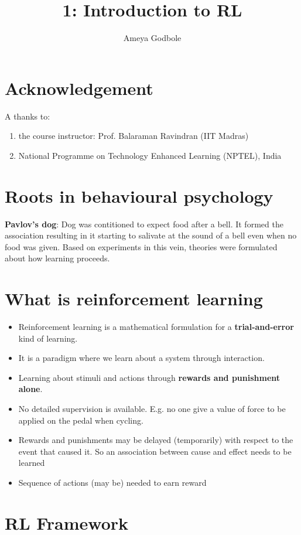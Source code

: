 \documentclass[a4paper]{article}
\title{1: Introduction to RL\vspace{-2ex}}
\author{Ameya Godbole}
\date{\vspace{-5ex}}
\begin{document}
\maketitle

\section{Acknowledgement}

A thanks to:
\begin{enumerate}
\item the course instructor: Prof. Balaraman Ravindran (IIT Madras)
\item National Programme on Technology Enhanced Learning (NPTEL), India
\end{enumerate}

\section{Roots in behavioural psychology}
\textbf{Pavlov's dog}: Dog was contitioned to expect food after a bell. It formed the association resulting in it starting to salivate at the sound of a bell even when no food was given. Based on experiments in this vein, theories were formulated about how learning proceeds.

\section{What is reinforcement learning}
\begin{itemize}
\item Reinforcement learning is a mathematical formulation for a \textbf{trial-and-error} kind of learning.
\item It is a paradigm where we learn about a system through interaction.
\item Learning about stimuli and actions through \textbf{rewards and punishment alone}.
\item No detailed supervision is available. E.g. no one give a value of force to be applied on the pedal when cycling.
\item Rewards and punishments may be delayed (temporarily) with respect to the event that caused it. So an association between cause and effect needs to be learned
\item Sequence of actions (may be) needed to earn reward
\end{itemize}

\section{RL Framework}
\end{document}

